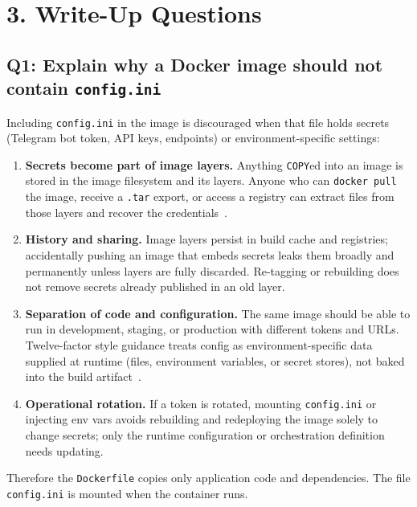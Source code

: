 \documentclass[11pt]{article}
\begin{document}
\section*{3. Write-Up Questions}

\subsection*{Q1: Explain why a Docker image should not contain \texttt{config.ini}}

Including \texttt{config.ini} in the image is discouraged when that file holds secrets (Telegram bot token, API keys, endpoints) or environment-specific settings:

\begin{enumerate}
  \item \textbf{Secrets become part of image layers.}
    Anything \texttt{COPY}ed into an image is stored in the image filesystem and its layers.
    Anyone who can \texttt{docker pull} the image, receive a \texttt{.tar} export, or access a registry can extract files from those layers and recover the credentials~\cite{docker-docs}.

  \item \textbf{History and sharing.}
    Image layers persist in build cache and registries; accidentally pushing an image that embeds secrets leaks them broadly and permanently unless layers are fully discarded.
    Re-tagging or rebuilding does not remove secrets already published in an old layer.

  \item \textbf{Separation of code and configuration.}
    The same image should be able to run in development, staging, or production with different tokens and URLs.
    Twelve-factor style guidance treats config as environment-specific data supplied at runtime (files, environment variables, or secret stores), not baked into the build artifact~\cite{twelve-factor-config}.

  \item \textbf{Operational rotation.}
    If a token is rotated, mounting \texttt{config.ini} or injecting env vars avoids rebuilding and redeploying the image solely to change secrets; only the runtime configuration or orchestration definition needs updating.
\end{enumerate}

Therefore the \texttt{Dockerfile} copies only application code and dependencies.
The file \texttt{config.ini} is mounted when the container runs.
\end{document}
